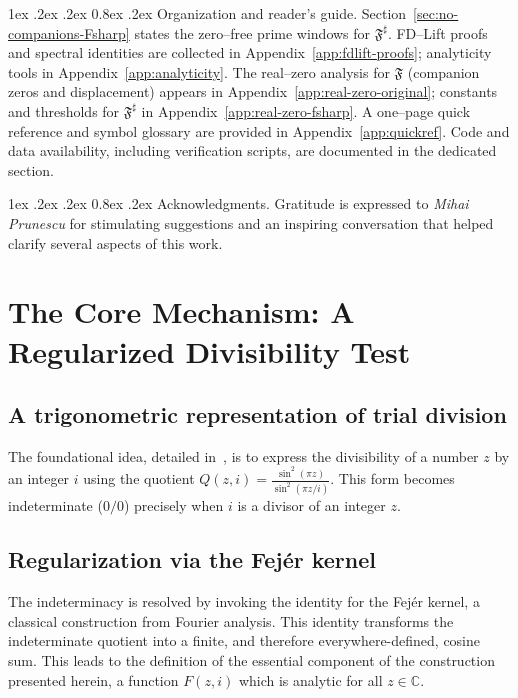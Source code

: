 \documentclass[11pt,a4paper]{amsart}
\makeatletter
\newcommand{\C}{\mathbb{C}}
\newcommand{\Fbase}{\mathfrak F}
\newcommand{\Fsharp}{\Fbase^{\sharp}}
\renewcommand\paragraph{\@startsection{paragraph}{4}{\z@}%
  {1ex \@plus .2ex \@minus .2ex}%
  {0.8ex \@plus .2ex}%
  {\normalfont\bfseries}}
\theoremstyle{plain}
\theoremstyle{definition}
\theoremstyle{remark}
\makeatother
\begin{document}
\paragraph{Organization and reader’s guide.}
Section~\ref{sec:no-companions-Fsharp} states the zero–free prime windows for $\Fsharp$.
FD–Lift proofs and spectral identities are collected in Appendix~\ref{app:fdlift-proofs}; analyticity tools in Appendix~\ref{app:analyticity}.
The real–zero analysis for $\mathfrak F$ (companion zeros and displacement) appears in Appendix~\ref{app:real-zero-original}; constants and thresholds for $\Fsharp$ in Appendix~\ref{app:real-zero-fsharp}.
A one–page quick reference and symbol glossary are provided in Appendix~\ref{app:quickref}.
Code and data availability, including verification scripts, are documented in the dedicated section.

\paragraph{Acknowledgments.}
Gratitude is expressed to \emph{Mihai Prunescu} for stimulating suggestions and an inspiring conversation that helped clarify several aspects of this work.

\section{The Core Mechanism: A Regularized Divisibility Test}

\subsection{A trigonometric representation of trial division}
The foundational idea, detailed in~\cite{fuchs2025}, is to express the divisibility of a number $z$ by an integer $i$ using the quotient $Q(z,i) = \frac{\sin^2(\pi z)}{\sin^2(\pi z/i)}$. This form becomes indeterminate ($0/0$) precisely when $i$ is a divisor of an integer $z$.

\subsection{Regularization via the Fej\'er kernel}
The indeterminacy is resolved by invoking the identity for the Fej\'er kernel, a classical construction from Fourier analysis. This identity transforms the indeterminate quotient into a finite, and therefore everywhere-defined, cosine sum. This leads to the definition of the essential component of the construction presented herein, a function $F(z,i)$ which is analytic for all $z \in \C$.
\end{document}
